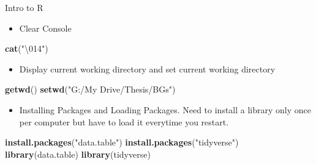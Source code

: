 \documentclass[ignorenonframetext,]{beamer}
\newenvironment{Shaded}{\begin{snugshade}}{\end{snugshade}}
\newcommand{\CharTok}[1]{\textcolor[rgb]{0.31,0.60,0.02}{#1}}
\newcommand{\KeywordTok}[1]{\textcolor[rgb]{0.13,0.29,0.53}{\textbf{#1}}}
\newcommand{\NormalTok}[1]{#1}
\newcommand{\StringTok}[1]{\textcolor[rgb]{0.31,0.60,0.02}{#1}}
\providecommand{\tightlist}{%
  \setlength{\itemsep}{0pt}\setlength{\parskip}{0pt}}
\begin{document}
\begin{frame}[fragile]{Intro to R}
\protect\hypertarget{intro-to-r}{}

\begin{itemize}
\tightlist
\item
  Clear Console
\end{itemize}

\begin{Shaded}
\begin{Highlighting}[]
\KeywordTok{cat}\NormalTok{(}\StringTok{"}\CharTok{\textbackslash{}014}\StringTok{"}\NormalTok{)}
\end{Highlighting}
\end{Shaded}

\begin{itemize}
\tightlist
\item
  Display current working directory and set current working directory
\end{itemize}

\begin{Shaded}
\begin{Highlighting}[]
\KeywordTok{getwd}\NormalTok{()}
\KeywordTok{setwd}\NormalTok{(}\StringTok{"G:/My Drive/Thesis/BGs"}\NormalTok{)}
\end{Highlighting}
\end{Shaded}

\begin{itemize}
\tightlist
\item
  Installing Packages and Loading Packages. Need to install a library
  only once per computer but have to load it everytime you restart.
\end{itemize}

\begin{Shaded}
\begin{Highlighting}[]
\KeywordTok{install.packages}\NormalTok{(}\StringTok{"data.table"}\NormalTok{)}
\KeywordTok{install.packages}\NormalTok{(}\StringTok{"tidyverse"}\NormalTok{)}
\KeywordTok{library}\NormalTok{(data.table)}
\KeywordTok{library}\NormalTok{(tidyverse)}
\end{Highlighting}
\end{Shaded}

\end{frame}
\end{document}
